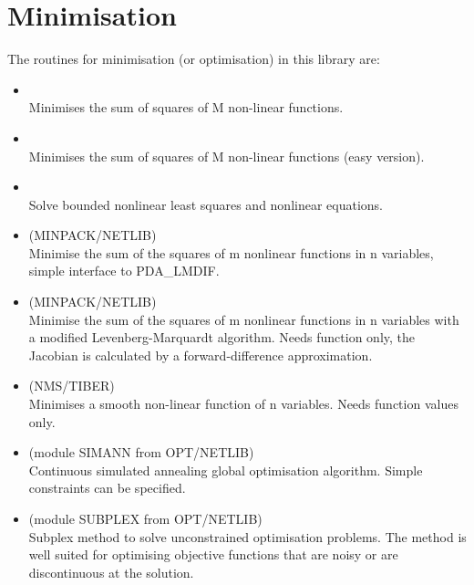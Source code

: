 \section{Minimisation}

   The routines for minimisation (or optimisation) in this library are:

\begin{itemize}

\item {} \\
   Minimises the sum of squares of M non-linear functions.

\item {} \\
   Minimises the sum of squares of M non-linear functions (easy version).

\item {} \\
   Solve bounded nonlinear least squares and nonlinear equations.

\item {} (MINPACK/NETLIB)\ \\
   Minimise the sum of the squares of m nonlinear functions in n
   variables, simple interface to PDA\_LMDIF.

\item {} (MINPACK/NETLIB)\ \\
   Minimise the sum of the squares of m nonlinear functions in n
   variables with a modified Levenberg-Marquardt algorithm. Needs
   function only, the Jacobian is calculated by a forward-difference
   approximation.

\item {} (NMS/TIBER)\ \\
   Minimises a smooth non-linear function of n variables. Needs
   function values only.

\item {} (module SIMANN from OPT/NETLIB)\ \\
   Continuous simulated annealing global optimisation algorithm.
   Simple constraints can be specified.

\item {} (module SUBPLEX from OPT/NETLIB)\ \\
   Subplex method to solve unconstrained optimisation problems.  The
   method is well suited for optimising objective functions that are
   noisy or are discontinuous at the solution.

\end{itemize}

